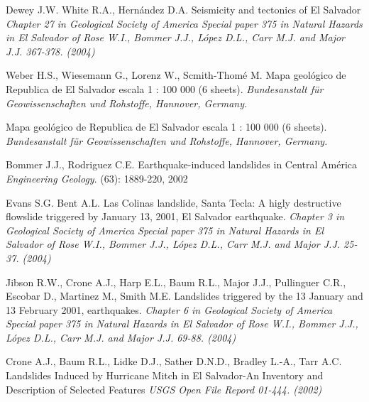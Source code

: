 \documentclass[11pt,twoside]{rmta2010esp}%
\begin{document}
\begin{thebibliography}{99}




Dewey J.W. White R.A., Hern\'{a}ndez D.A.
\newblock Seismicity and tectonics of El Salvador
\newblock \emph{Chapter 27 in Geological Society of America Special paper 375 in Natural Hazards in El Salvador of Rose W.I., Bommer J.J., L\'{o}pez D.L., Carr M.J. and Major J.J. 367-378. (2004)}


Weber H.S., Wiesemann G., Lorenz  W., Scmith-Thom\'{e} M.
\newblock Mapa geol\'{o}gico de Republica de El Salvador
\newblock escala 1 : 100 000 (6 sheets).
\newblock \emph{ Bundesanstalt f\"ur Geowissenschaften und Rohstoffe, Hannover, Germany. }



\newblock Mapa geol\'{o}gico de Republica de El Salvador
\newblock escala 1 : 100 000 (6 sheets).
\newblock \emph{ Bundesanstalt f\"ur Geowissenschaften und Rohstoffe, Hannover, Germany. }



Bommer J.J., Rodriguez C.E.
\newblock Earthquake-induced landslides in Central Am\'{e}rica
\newblock \emph{Engineering Geology}.
(63): 1889-220, 2002


Evans S.G. Bent A.L.
\newblock Las Colinas landslide, Santa Tecla:  A higly destructive flowslide triggered by January 13, 2001, El Salvador earthquake.
\newblock \emph{Chapter 3 in Geological Society of America Special paper 375 in Natural Hazards in El Salvador of Rose W.I., Bommer J.J., L\'{o}pez D.L., Carr M.J. and Major J.J. 25-37. (2004)}



Jibson R.W., Crone A.J., Harp E.L., Baum R.L., Major J.J., Pullinguer C.R., Escobar D., Martinez M., Smith M.E. 
\newblock Landslides triggered by the 13 January and 13 February 2001, earthquakes.
\newblock \emph{ Chapter 6 in Geological Society of America Special paper 375 in Natural Hazards in El Salvador of Rose W.I., Bommer J.J., L\'{o}pez D.L., Carr M.J. and Major J.J. 69-88. (2004)}



Crone A.J., Baum R.L., Lidke D.J., Sather D.N.D., Bradley L.-A., Tarr A.C.
\newblock Landslides Induced by Hurricane Mitch in El Salvador-An Inventory and Description of Selected Features
\newblock \emph{USGS Open File Repord 01-444. (2002)}




\end{thebibliography}
\end{document}

